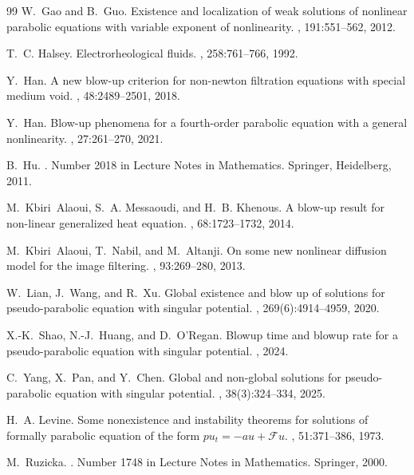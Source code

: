 \documentclass[12pt,reqno]{amsart}
\theoremstyle{definition}
\theoremstyle{remark}
\numberwithin{equation}{section}
\begin{document}
\begin{thebibliography}{99}
W.~Gao and B.~Guo.
\newblock Existence and localization of weak solutions of nonlinear parabolic
equations with variable exponent of nonlinearity.
, 191:551--562, 2012.

T.~C. Halsey.
\newblock Electrorheological fluids.
, 258:761--766, 1992.

Y.~Han.
\newblock A new blow-up criterion for non-newton filtration equations with
special medium void.
, 48:2489--2501, 2018.

Y.~Han.
\newblock Blow-up phenomena for a fourth-order parabolic equation with a
general nonlinearity.
, 27:261–270, 2021.

B.~Hu.
.
\newblock Number 2018 in Lecture Notes in Mathematics. Springer, Heidelberg,
2011.

M.~Kbiri~Alaoui, S.~A. Messaoudi, and H.~B. Khenous.
\newblock A blow-up result for non-linear generalized heat equation.
, 68:1723--1732,
2014.

M.~Kbiri~Alaoui, T.~Nabil, and M.~Altanji.
\newblock On some new nonlinear diffusion model for the image filtering.
, 93:269--280, 2013.


W.~Lian, J.~Wang, and R.~Xu.
\newblock Global existence and blow up of solutions for pseudo-parabolic equation with singular potential.
, 269(6):4914--4959, 2020.

X.-K.~Shao, N.-J.~Huang, and D.~O'Regan.
\newblock Blowup time and blowup rate for a pseudo-parabolic equation with singular potential.
, 2024.

C.~Yang, X.~Pan, and Y.~Chen.
\newblock Global and non-global solutions for pseudo-parabolic equation with singular potential.
, 38(3):324--334, 2025.

H.~A. Levine.
\newblock Some nonexistence and instability theorems for solutions of formally
parabolic equation of the form $pu_t = -au + \mathcal{F}u$.
, 51:371--386, 1973.

M.~Ruzicka.
.
\newblock Number 1748 in Lecture Notes in Mathematics. Springer, 2000.


\end{thebibliography}
\end{document}

